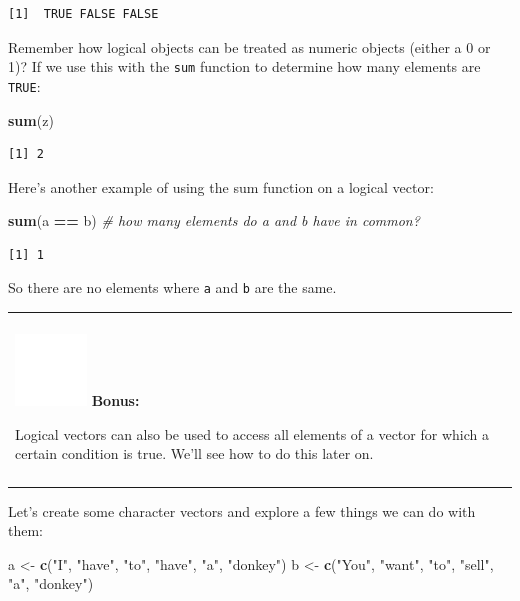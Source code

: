 \documentclass[
]{book}
\newenvironment{Shaded}{\begin{snugshade}}{\end{snugshade}}
\newcommand{\CommentTok}[1]{\textcolor[rgb]{0.56,0.35,0.01}{\textit{#1}}}
\newcommand{\KeywordTok}[1]{\textcolor[rgb]{0.13,0.29,0.53}{\textbf{#1}}}
\newcommand{\NormalTok}[1]{#1}
\newcommand{\OperatorTok}[1]{\textcolor[rgb]{0.81,0.36,0.00}{\textbf{#1}}}
\newcommand{\StringTok}[1]{\textcolor[rgb]{0.31,0.60,0.02}{#1}}
\newenvironment{bonus}
{
  \begin{center}
  \begin{tabular}{|>{\columncolor{bonus}\color{white}}p{0.9\textwidth}|}\hline\\
  \includegraphics[scale=0.1]{src/images/sun-fill-invert.png}
  \textbf{Bonus:}
}
{\\\\\hline
  \end{tabular}
  \end{center}
}
\begin{document}
\begin{verbatim}
[1]  TRUE FALSE FALSE
\end{verbatim}

Remember how logical objects can be treated as numeric objects (either a 0 or 1)?
If we use this with the \texttt{sum} function to determine how many elements are \texttt{TRUE}:

\begin{Shaded}
\begin{Highlighting}[]
\KeywordTok{sum}\NormalTok{(z)}
\end{Highlighting}
\end{Shaded}

\begin{verbatim}
[1] 2
\end{verbatim}

Here's another example of using the sum function on a logical vector:

\begin{Shaded}
\begin{Highlighting}[]
\KeywordTok{sum}\NormalTok{(a }\OperatorTok{==}\StringTok{ }\NormalTok{b)  }\CommentTok{# how many elements do a and b have in common?}
\end{Highlighting}
\end{Shaded}

\begin{verbatim}
[1] 1
\end{verbatim}

So there are no elements where \texttt{a} and \texttt{b} are the same.

\begin{bonus}
Logical vectors can also be used to access all elements of a vector for
which a certain condition is true. We'll see how to do this later on.
\end{bonus}

Let's create some character vectors and explore a few things we can do with them:

\begin{Shaded}
\begin{Highlighting}[]
\NormalTok{a <-}\StringTok{ }\KeywordTok{c}\NormalTok{(}\StringTok{"I"}\NormalTok{, }\StringTok{"have"}\NormalTok{, }\StringTok{"to"}\NormalTok{, }\StringTok{"have"}\NormalTok{, }\StringTok{"a"}\NormalTok{, }\StringTok{"donkey"}\NormalTok{)}
\NormalTok{b <-}\StringTok{ }\KeywordTok{c}\NormalTok{(}\StringTok{"You"}\NormalTok{, }\StringTok{"want"}\NormalTok{, }\StringTok{"to"}\NormalTok{, }\StringTok{"sell"}\NormalTok{, }\StringTok{"a"}\NormalTok{, }\StringTok{"donkey"}\NormalTok{)}
\end{Highlighting}
\end{Shaded}
\end{document}
